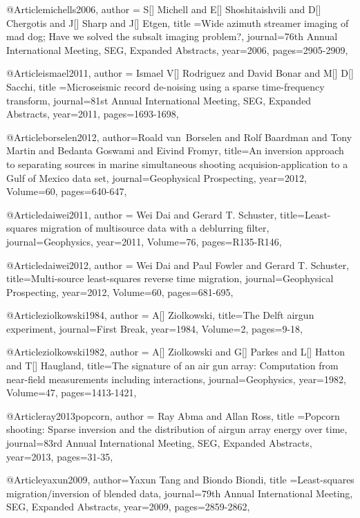 {@Article{michells2006,
  author = {S[] Michell and E[] Shoshitaishvili and D[] Chergotis and J[] Sharp and J[] Etgen},
  title ={Wide azimuth streamer imaging of mad dog; Have we solved the subsalt imaging problem?},
  journal={76th Annual International Meeting, SEG, Expanded Abstracts},
  year=2006,
  pages={2905-2909},
}

@Article{ismael2011,
  author = {Ismael V[] Rodriguez and David Bonar and M[] D[] Sacchi},
  title ={Microseismic record de-noising using a sparse time-frequency transform},
  journal={81st Annual International Meeting, SEG, Expanded Abstracts},
  year=2011,
  pages={1693-1698},
}

@Article{borselen2012,
  author={Roald van~Borselen and Rolf Baardman and Tony Martin and Bedanta Goswami and Eivind Fromyr},
  title={An inversion approach to separating sources in marine simultaneous shooting acquision-application to a Gulf of Mexico data set},
  journal={Geophysical Prospecting},
  year=2012,
  Volume=60,
  pages={640-647},
}

@Article{daiwei2011,
  author = {Wei Dai and Gerard T. Schuster},
  title={Least-squares migration of multisource data with a deblurring filter},
  journal={Geophysics},
  year=2011,
  Volume=76,
  pages={R135-R146},
}

@Article{daiwei2012,
  author = {Wei Dai and Paul Fowler and Gerard T. Schuster},
  title={Multi-source least-squares reverse time migration},
  journal={Geophysical Prospecting},
  year=2012,
  Volume=60,
  pages={681-695},
}
	
@Article{ziolkowski1984,
  author = {A[] Ziolkowski},
  title={The Delft airgun experiment},
  journal={First Break},
  year=1984,
  Volume=2,
  pages={9-18},
}

@Article{ziolkowski1982,
  author = {A[] Ziolkowski and G[] Parkes and L[] Hatton and T[] Haugland},
  title={The signature of an air gun array:
Computation from near-field measurements including interactions},
  journal={Geophysics},
  year=1982,
  Volume=47,
  pages={1413-1421},
}

@Article{ray2013popcorn,
  author = {Ray Abma and Allan Ross},
  title ={Popcorn shooting: Sparse inversion and the distribution of airgun array energy over time},
  journal={83rd Annual International Meeting, SEG, Expanded Abstracts},
  year=2013,
  pages={31-35},
}

@Article{yaxun2009,
  author={Yaxun Tang and Biondo Biondi},
  title ={Least-squares migration/inversion of blended data},
  journal={79th Annual International Meeting, SEG, Expanded Abstracts},
  year=2009,
  pages={2859-2862},
}

}
